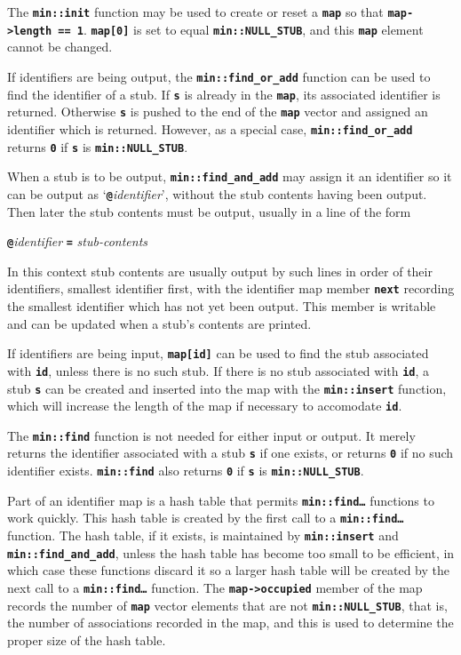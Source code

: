 \documentclass[12pt]{article}
\newcommand{\TT}[1]{{\tt \bfseries #1}}
\newcommand{\EOL}{\penalty \exhyphenpenalty}
\begin{document}
The \TT{min::init} function may be used to create or reset a \TT{map}
so that \TT{map->length == 1}.  \TT{map[0]} is set to equal
\TT{min::\EOL NULL\_\EOL STUB}, and this \TT{map} element cannot
be changed.

If identifiers are being output, the \TT{min::find\_\EOL or\_\EOL add}
function can be used to find the identifier of a stub.  If \TT{s} is already
in the \TT{map}, its associated identifier is returned.  Otherwise \TT{s}
is pushed to the end of the \TT{map} vector and assigned an identifier which
is returned.  However, as a special case,
\TT{min::\EOL find\_\EOL or\_\EOL add} returns
\TT{0} if \TT{s} is \TT{min::\EOL NULL\_\EOL STUB}.

When a stub is to be output, \TT{min::\EOL find\_\EOL and\_\EOL add}
may assign it an identifier so it can be
output as `\TT{@}{\em identifier}', without the stub contents having been
output.  Then later the stub contents must be output, usually in a line of the
form
\begin{center}
\TT{@}{\em identifier} \TT{=} {\em stub-contents}
\end{center}
In this context stub contents are usually output by such lines in order of
their identifiers, smallest identifier first, with the identifier
map member \TT{next} recording the smallest identifier which has
not yet been output.  This member is writable and can be updated
when a stub's contents are printed.

If identifiers are being input, \TT{map[id]} can be used to find the stub
associated with \TT{id}, unless there is no such stub.
If there is no stub associated with \TT{id}, a stub \TT{s}
can be created and inserted into the map with the \TT{min::\EOL insert}
function, which will increase the length of the map if necessary to
accomodate \TT{id}.

The \TT{min::find} function is not needed for either input or output.
It merely returns the identifier associated with a stub \TT{s} if one exists,
or returns \TT{0} if no such identifier exists.
\TT{min::\EOL find} also returns
\TT{0} if \TT{s} is \TT{min::\EOL NULL\_\EOL STUB}.

Part of an identifier map is a hash table that permits
\TT{min::\EOL find\ldots} functions to work quickly.  This
hash table is created by the first call to a
\TT{min::\EOL find\ldots} function.
The hash table, if it exists, is maintained by \TT{min::\EOL insert}
and \TT{min::\EOL find\_\EOL and\_\EOL add},
unless the hash table has become too small to be efficient, in which case
these functions discard it so a larger hash table will be created
by the next call to a \TT{min::\EOL find\ldots} function.
The \TT{map->\EOL occupied} member of the map records the number of
\TT{map} vector elements that are not \TT{min::\EOL NULL\_\EOL STUB},
that is, the number of associations recorded in the map, and this is used
to determine the proper size of the hash table.
\end{document}
